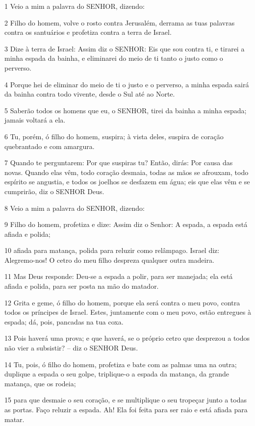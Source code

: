 \par 1 Veio a mim a palavra do SENHOR, dizendo:
\par 2 Filho do homem, volve o rosto contra Jerusalém, derrama as tuas palavras contra os santuários e profetiza contra a terra de Israel.
\par 3 Dize à terra de Israel: Assim diz o SENHOR: Eis que sou contra ti, e tirarei a minha espada da bainha, e eliminarei do meio de ti tanto o justo como o perverso.
\par 4 Porque hei de eliminar do meio de ti o justo e o perverso, a minha espada sairá da bainha contra todo vivente, desde o Sul até ao Norte.
\par 5 Saberão todos os homens que eu, o SENHOR, tirei da bainha a minha espada; jamais voltará a ela.
\par 6 Tu, porém, ó filho do homem, suspira; à vista deles, suspira de coração quebrantado e com amargura.
\par 7 Quando te perguntarem: Por que suspiras tu? Então, dirás: Por causa das novas. Quando elas vêm, todo coração desmaia, todas as mãos se afrouxam, todo espírito se angustia, e todos os joelhos se desfazem em água; eis que elas vêm e se cumprirão, diz o SENHOR Deus.
\par 8 Veio a mim a palavra do SENHOR, dizendo:
\par 9 Filho do homem, profetiza e dize: Assim diz o Senhor: A espada, a espada está afiada e polida;
\par 10 afiada para matança, polida para reluzir como relâmpago. Israel diz: Alegremo-nos! O cetro do meu filho despreza qualquer outra madeira.
\par 11 Mas Deus responde: Deu-se a espada a polir, para ser manejada; ela está afiada e polida, para ser posta na mão do matador.
\par 12 Grita e geme, ó filho do homem, porque ela será contra o meu povo, contra todos os príncipes de Israel. Estes, juntamente com o meu povo, estão entregues à espada; dá, pois, pancadas na tua coxa.
\par 13 Pois haverá uma prova; e que haverá, se o próprio cetro que desprezou a todos não vier a subsistir? -- diz o SENHOR Deus.
\par 14 Tu, pois, ó filho do homem, profetiza e bate com as palmas uma na outra; duplique a espada o seu golpe, triplique-o a espada da matança, da grande matança, que os rodeia;
\par 15 para que desmaie o seu coração, e se multiplique o seu tropeçar junto a todas as portas. Faço reluzir a espada. Ah! Ela foi feita para ser raio e está afiada para matar.
